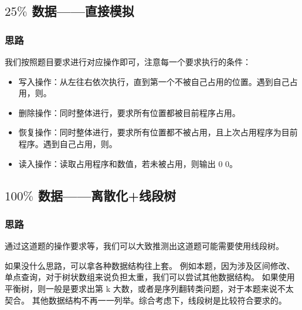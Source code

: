 
% 

\subsection{$25\%$ 数据——直接模拟}

\subsubsection{思路}

我们按照题目要求进行对应操作即可，注意每一个要求执行的条件：

\begin{itemize}
    \item 写入操作：从左往右依次执行，直到第一个不被自己占用的位置。{}遇到自己占用，则{}。
    \item 删除操作：同时整体进行，要求所有位置都被目前程序占用。{}
    \item 恢复操作：同时整体进行，要求所有位置都不被占用，且上次占用程序为目前程序。{}遇到自己占用，则{}。
    \item 读入操作：读取占用程序和数值，若未被占用，则输出 0 0。
\end{itemize}

\subsection{$100\%$ 数据——离散化+线段树}

\subsubsection{思路}

通过这道题的操作要求等，我们可以大致推测出这道题可能需要使用线段树。

\begin{note}
    如果没什么思路，可以拿各种数据结构往上套。
    例如本题，因为涉及区间修改、单点查询，对于树状数组来说负担太重，我们可以尝试其他数据结构。
    如果使用平衡树，则一般是要求出第 k 大数，或者是序列翻转类问题，对于本题来说不太契合。
    其他数据结构不再一一列举。综合考虑下，线段树是比较符合要求的。
\end{note}

